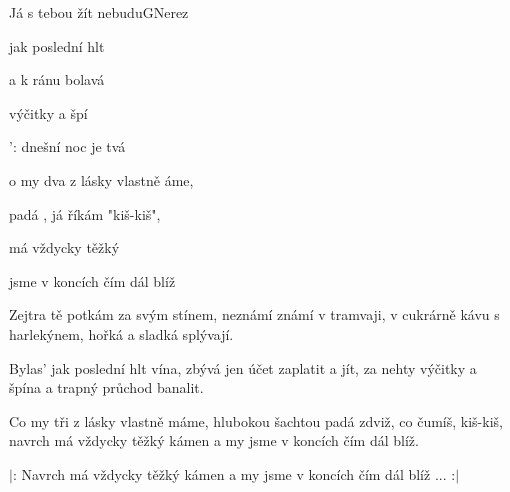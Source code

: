 \begin{song}{Já s tebou žít nebudu}{G}{Nerez}

\begin{SBVerse}

 jak poslední hlt 

 a k ránu bolavá

 výčitky a špí

': dnešní noc je tvá

\end{SBVerse}

\begin{SBChorus}

o my dva z lásky vlastně áme,

  padá , já říkám "kiš-kiš",

 má vždycky těžký 

 jsme v koncích čím dál blíž

\end{SBChorus}

\begin{SBVerse}

Zejtra tě potkám za svým stínem,
neznámí známí v tramvaji,
v cukrárně kávu s harlekýnem,
hořká a sladká splývají.

\end{SBVerse}

\begin{SBChorus}

\end{SBChorus}

\begin{SBVerse}

Bylas' jak poslední hlt vína,
zbývá jen účet zaplatit a jít,
za nehty výčitky a špína
a trapný průchod banalit.

\end{SBVerse}

\begin{SBChorus}

Co my tři z lásky vlastně máme,
hlubokou šachtou padá zdviž, co čumíš, kiš-kiš,
navrch má vždycky těžký kámen
a my jsme v koncích čím dál blíž.

\end{SBChorus}

\begin{SBChorus*}

$|$: Navrch má vždycky těžký kámen
a my jsme v koncích čím dál blíž ... :$|$

\end{SBChorus*}

\end{song}

\clearpage
